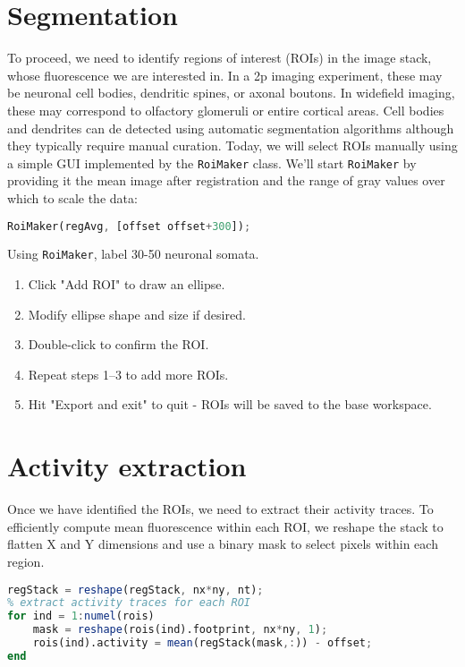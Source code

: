 \documentclass[a4paper]{report}
\newcommand{\nexercise}[0]{\arabic{exercises}\addtocounter{exercises}{1}}
\begin{document}
\section{Segmentation}
To proceed, we need to identify regions of interest (ROIs) in the image stack, whose fluorescence we are interested in. 
In a 2p imaging experiment, these may be neuronal cell bodies, dendritic spines, or axonal boutons. 
In widefield imaging, these may correspond to olfactory glomeruli or entire cortical areas.
Cell bodies and dendrites can de detected using automatic segmentation algorithms although they typically require manual curation.
Today, we will select ROIs manually using a simple GUI implemented by the \texttt{RoiMaker} class.
We'll start \texttt{RoiMaker} by providing it the mean image after registration and the range of gray values over which to scale the data:
\begin{lstlisting}[language=Octave]
% select some ROIs using a simple GUI
RoiMaker(regAvg, [offset offset+300]);
\end{lstlisting}

\begin{exercisebox}[frametitle={Exercise \nexercise: Defining ROIs}]
Using \texttt{RoiMaker}, label 30-50 neuronal somata.
\begin{enumerate}
\item Click "Add ROI" to draw an ellipse.
\item Modify ellipse shape and size if desired.
\item Double-click to confirm the ROI.
\item Repeat steps 1--3 to add more ROIs.
\item Hit "Export and exit" to quit - ROIs will be saved to the base workspace.
\end{enumerate}
\end{exercisebox}

\section{Activity extraction}
Once we have identified the ROIs, we need to extract their activity traces. 
To efficiently compute mean fluorescence within each ROI, we reshape the stack to flatten X and Y dimensions and use a binary mask to select pixels within each region.
\begin{lstlisting}[language=Octave]
% reshape the stack for easy indexing
regStack = reshape(regStack, nx*ny, nt);
% extract activity traces for each ROI
for ind = 1:numel(rois)
    mask = reshape(rois(ind).footprint, nx*ny, 1);
    rois(ind).activity = mean(regStack(mask,:)) - offset;
end
\end{lstlisting}
\end{document}
